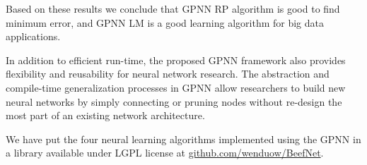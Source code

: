 \documentclass[procedia]{easychair}
\begin{document}
Based on these results we conclude that GPNN RP algorithm is good to find minimum error, and GPNN LM is a good learning algorithm for big data applications.

In addition to efficient run-time, the proposed GPNN framework also provides flexibility and reusability for neural network research.  The abstraction and compile-time generalization processes in GPNN allow researchers to build new neural networks by simply connecting or pruning nodes without re-design the most part of an existing network architecture.

We have put the four neural learning algorithms implemented using the GPNN in a library available under LGPL license at \url{github.com/wenduow/BeefNet}.






\end{document}
